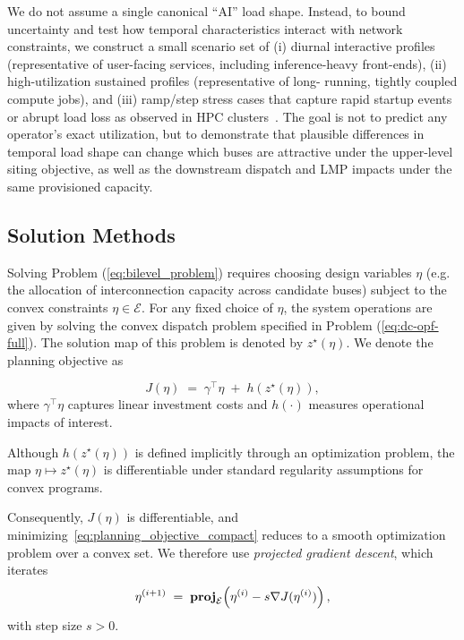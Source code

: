 We do not assume a single canonical ``AI'' load shape. Instead, to bound 
uncertainty and test how temporal characteristics interact with network 
constraints, we construct a small scenario set of (i) diurnal interactive 
profiles (representative of user-facing services, including inference-heavy 
front-ends), (ii) high-utilization sustained profiles (representative of long-
running, tightly coupled compute jobs), and (iii) ramp/step stress cases that 
capture rapid startup events or abrupt load loss as observed in HPC 
clusters~\cite{bates2015, shin2021revealing, patki2025global}. 
The goal is not to predict any operator’s exact utilization, but to demonstrate 
that plausible differences in temporal load shape can change which buses are 
attractive under the upper-level siting objective, as well as the downstream 
dispatch and LMP impacts under the same provisioned capacity.

\subsection{Solution Methods}

Solving Problem (\ref{eq:bilevel_problem}) requires choosing design variables $\eta$ (e.g. the allocation of interconnection capacity across candidate buses) subject to the convex constraints $\eta \in \mathcal{E}$. For any fixed choice of $\eta$, the system operations are given by solving the convex dispatch problem specified in Problem (\ref{eq:dc-opf-full}). The solution map of this problem is denoted by $z^{\star}(\eta)$. We denote the planning objective as 

\begin{equation}
    J(\eta) \;=\; \gamma^\top \eta \;+\; h\!\left(z^\star(\eta)\right),
    \label{eq:planning_objective_compact}
\end{equation}
where $\gamma^\top \eta$ captures linear investment costs and $h(\cdot)$ measures operational impacts of interest.

Although $h(z^\star(\eta))$ is defined implicitly through an optimization problem, the map $\eta \mapsto z^\star(\eta)$ is differentiable under standard regularity assumptions for convex programs. 

Consequently, $J(\eta)$ is differentiable, and minimizing~\eqref{eq:planning_objective_compact} reduces to a smooth optimization problem over a convex set. We therefore use \emph{projected gradient descent}, which iterates
\begin{equation}
\eta^{(i+1)} \;=\; \mathbf{proj}_{\mathcal{E}}\!\left(\eta^{(i)} - s \nabla J(\eta^{(i)})\right),
\label{eq:pgd_compact}
\end{equation}
with step size $s>0$.

